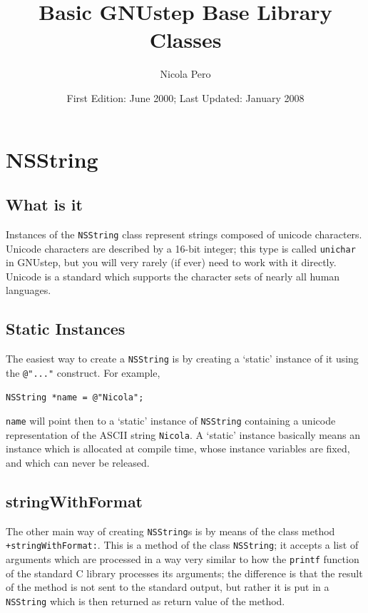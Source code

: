 \documentclass[a4paper]{article}
\begin{document}
\author{Nicola Pero}
\title{Basic GNUstep Base Library Classes}
\date{First Edition: June 2000; Last Updated: January 2008}
\maketitle

\section{NSString}
\subsection{What is it}
Instances of the \texttt{NSString} class represent strings composed of
unicode characters.  Unicode characters are described by a 16-bit
integer; this type is called \texttt{unichar} in GNUstep, but you will
very rarely (if ever) need to work with it directly.  Unicode is a
standard which supports the character sets of nearly all human
languages.

\subsection{Static Instances}
The easiest way to create a \texttt{NSString} is by creating a `static' 
instance of it using the \texttt{@"..."} construct.  For example, 
\begin{verbatim}
NSString *name = @"Nicola";
\end{verbatim}
\texttt{name} will point then to a `static' instance of
\texttt{NSString} containing a unicode representation of the ASCII
string \texttt{Nicola}.  A `static' instance basically means an
instance which is allocated at compile time, whose instance variables
are fixed, and which can never be released.

\subsection{stringWithFormat}
The other main way of creating \texttt{NSString}s is by means of the
class method \texttt{+stringWithFormat:}.  This is a method of the
class \texttt{NSString}; it accepts a list of arguments which are
processed in a way very similar to how the \texttt{printf} function of
the standard C library processes its arguments; the difference is that
the result of the method is not sent to the standard output, but
rather it is put in a \texttt{NSString} which is then returned as
return value of the method.
\end{document}

